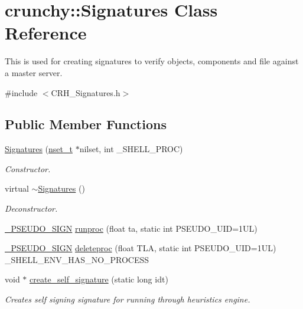 \hypertarget{classcrunchy_1_1_signatures}{}\section{crunchy\+:\+:Signatures Class Reference}
\label{classcrunchy_1_1_signatures}


This is used for creating signatures to verify objects, components and file against a master server.  




{\ttfamily \#include $<$C\+R\+H\+\_\+\+Signatures.\+h$>$}

\subsection*{Public Member Functions}
\begin{DoxyCompactItemize}
\item 
\hyperlink{classcrunchy_1_1_signatures_a953e432067bbec5ee40c6eecbcb106de}{Signatures} (\hyperlink{structcrunchy_1_1nset__t}{nset\+\_\+t} $\ast$nilset, int \+\_\+\+S\+H\+E\+L\+L\+\_\+\+P\+R\+O\+C)
\begin{DoxyCompactList}\small\item\em Constructor. \end{DoxyCompactList}\item 
virtual \hyperlink{classcrunchy_1_1_signatures_a1c96f7c33f3ed8cb6339eb406d9d3ca6}{$\sim$\+Signatures} ()
\begin{DoxyCompactList}\small\item\em Deconstructor. \end{DoxyCompactList}\item 
\hyperlink{_c_r_h___signatures_8h_a3f5aecd604689fdd466ced4997e5331e}{\+\_\+\+P\+S\+E\+U\+D\+O\+\_\+\+S\+I\+G\+N} \hyperlink{classcrunchy_1_1_signatures_af0273a4bbc0df1f36dbb43b396dc7dbf}{runproc} (float ta, static int P\+S\+E\+U\+D\+O\+\_\+\+U\+I\+D=1\+U\+L)
\item 
\hyperlink{_c_r_h___signatures_8h_a3f5aecd604689fdd466ced4997e5331e}{\+\_\+\+P\+S\+E\+U\+D\+O\+\_\+\+S\+I\+G\+N} \hyperlink{classcrunchy_1_1_signatures_a3eec9cfb4f8cf5fdbdf72769acf94a9c}{deleteproc} (float T\+L\+A, static int P\+S\+E\+U\+D\+O\+\_\+\+U\+I\+D=1\+U\+L) \+\_\+\+S\+H\+E\+L\+L\+\_\+\+E\+N\+V\+\_\+\+H\+A\+S\+\_\+\+N\+O\+\_\+\+P\+R\+O\+C\+E\+S\+S
\item 
void $\ast$ \hyperlink{classcrunchy_1_1_signatures_afefdc514b781bc498ae25612215c2678}{create\+\_\+self\+\_\+signature} (static long idt)
\begin{DoxyCompactList}\small\item\em Creates self signing signature for running through heuristics engine. \end{DoxyCompactList}\end{DoxyCompactItemize}


